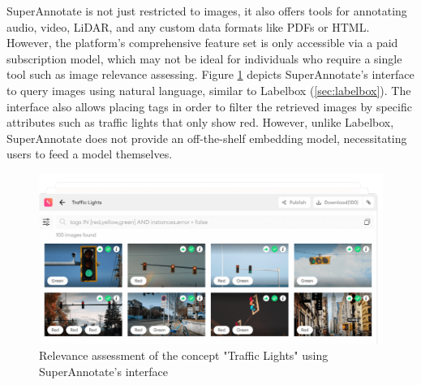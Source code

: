\documentclass{l4proj}
\begin{document}
SuperAnnotate is not just restricted to images, it also offers tools for annotating audio, video, LiDAR, and any custom data formats like PDFs or HTML. However, the platform's comprehensive feature set is only accessible via a paid subscription model, which may not be ideal for individuals who require a single tool such as image relevance assessing. Figure \ref{fig:superannotate_interface} depicts SuperAnnotate's interface to query images using natural language, similar to Labelbox (\ref{sec:labelbox}). The interface also allows placing tags in order to filter the retrieved images by specific attributes such as traffic lights that only show red. However, unlike Labelbox, SuperAnnotate does not provide an off-the-shelf embedding model, necessitating users to feed a model themselves.

\begin{figure}[h]
    \centering
    \includegraphics[width=1\textwidth]{figures/superannotate_interface.pdf}
    \caption{Relevance assessment of the concept "Traffic Lights" using SuperAnnotate's interface}
    \label{fig:superannotate_interface}
\end{figure}


\end{document}
